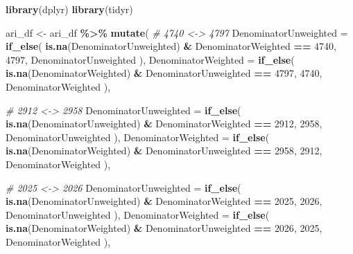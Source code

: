 \documentclass[
]{article}
\newenvironment{Shaded}{\begin{snugshade}}{\end{snugshade}}
\newcommand{\AttributeTok}[1]{\textcolor[rgb]{0.13,0.29,0.53}{#1}}
\newcommand{\CommentTok}[1]{\textcolor[rgb]{0.56,0.35,0.01}{\textit{#1}}}
\newcommand{\DecValTok}[1]{\textcolor[rgb]{0.00,0.00,0.81}{#1}}
\newcommand{\FunctionTok}[1]{\textcolor[rgb]{0.13,0.29,0.53}{\textbf{#1}}}
\newcommand{\NormalTok}[1]{#1}
\newcommand{\OtherTok}[1]{\textcolor[rgb]{0.56,0.35,0.01}{#1}}
\newcommand{\SpecialCharTok}[1]{\textcolor[rgb]{0.81,0.36,0.00}{\textbf{#1}}}
\begin{document}
\begin{Shaded}
\begin{Highlighting}[]
\FunctionTok{library}\NormalTok{(dplyr)}
\FunctionTok{library}\NormalTok{(tidyr)}


\NormalTok{ari\_df }\OtherTok{\textless{}{-}}\NormalTok{ ari\_df }\SpecialCharTok{\%\textgreater{}\%}
   \FunctionTok{mutate}\NormalTok{(}
    \CommentTok{\# 4740 \textless{}{-}\textgreater{} 4797}
    \AttributeTok{DenominatorUnweighted =} \FunctionTok{if\_else}\NormalTok{(}
      \FunctionTok{is.na}\NormalTok{(DenominatorUnweighted) }\SpecialCharTok{\&}\NormalTok{ DenominatorWeighted }\SpecialCharTok{==} \DecValTok{4740}\NormalTok{,}
      \DecValTok{4797}\NormalTok{,}
\NormalTok{      DenominatorUnweighted}
\NormalTok{    ),}
    \AttributeTok{DenominatorWeighted =} \FunctionTok{if\_else}\NormalTok{(}
      \FunctionTok{is.na}\NormalTok{(DenominatorWeighted) }\SpecialCharTok{\&}\NormalTok{ DenominatorUnweighted }\SpecialCharTok{==} \DecValTok{4797}\NormalTok{,}
      \DecValTok{4740}\NormalTok{,}
\NormalTok{      DenominatorWeighted}
\NormalTok{    ),}

    \CommentTok{\# 2912 \textless{}{-}\textgreater{} 2958}
    \AttributeTok{DenominatorUnweighted =} \FunctionTok{if\_else}\NormalTok{(}
      \FunctionTok{is.na}\NormalTok{(DenominatorUnweighted) }\SpecialCharTok{\&}\NormalTok{ DenominatorWeighted }\SpecialCharTok{==} \DecValTok{2912}\NormalTok{,}
      \DecValTok{2958}\NormalTok{,}
\NormalTok{      DenominatorUnweighted}
\NormalTok{    ),}
    \AttributeTok{DenominatorWeighted =} \FunctionTok{if\_else}\NormalTok{(}
      \FunctionTok{is.na}\NormalTok{(DenominatorWeighted) }\SpecialCharTok{\&}\NormalTok{ DenominatorUnweighted }\SpecialCharTok{==} \DecValTok{2958}\NormalTok{,}
      \DecValTok{2912}\NormalTok{,}
\NormalTok{      DenominatorWeighted}
\NormalTok{    ),}

    \CommentTok{\# 2025 \textless{}{-}\textgreater{} 2026}
    \AttributeTok{DenominatorUnweighted =} \FunctionTok{if\_else}\NormalTok{(}
      \FunctionTok{is.na}\NormalTok{(DenominatorUnweighted) }\SpecialCharTok{\&}\NormalTok{ DenominatorWeighted }\SpecialCharTok{==} \DecValTok{2025}\NormalTok{,}
      \DecValTok{2026}\NormalTok{,}
\NormalTok{      DenominatorUnweighted}
\NormalTok{    ),}
    \AttributeTok{DenominatorWeighted =} \FunctionTok{if\_else}\NormalTok{(}
      \FunctionTok{is.na}\NormalTok{(DenominatorWeighted) }\SpecialCharTok{\&}\NormalTok{ DenominatorUnweighted }\SpecialCharTok{==} \DecValTok{2026}\NormalTok{,}
      \DecValTok{2025}\NormalTok{,}
\NormalTok{      DenominatorWeighted}
\NormalTok{    ),}


\end{Highlighting}
\end{Shaded}
\end{document}
